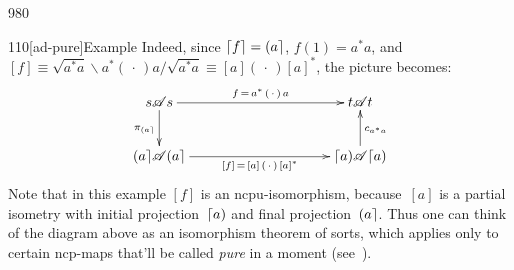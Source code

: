 \begin{parsec}{980}
\begin{point}{110}[ad-pure]{Example}
Indeed,
since  $\left\lceil f\right\rceil=\left(a\right\rceil$,
$f(1)=a^*a$,
and~$[f]\equiv \sqrt{a^*a}\backslash a^*(\,\cdot\,)a/\sqrt{a^*a}
\equiv [a](\,\cdot\,)[a]^*$,
the picture becomes:
\begin{equation*}
\xymatrix@C=10em{
s\scrA s
\ar[r]^-{f\,=\,a^*\,(\,\cdot\,)\,a}
\ar[d]_{\pi_{\ceilr{a}}}
&
t\scrA t
\\
\ceilr{a}\!\scrA\!\ceilr{a}
\ar[r]_-{[f] \,=\,  [a]\,(\,\cdot\,)\,[a]^*}
& 
\ceill{a}\!\scrA\!\ceill{a}
\ar[u]_{c_{a^*a}}
}
\end{equation*}
Note that in this example
$[f]$ is an ncpu-isomorphism,
because~$[a]$ is a partial isometry
with initial projection~$\left\lceil a\right)$
and final projection~$\left(a\right\rceil$.
Thus one can think of the diagram above
as an isomorphism theorem of sorts,
which applies only to certain  ncp-maps
that'll be called \emph{pure} in a moment (see~).
\end{point}
\end{parsec}
